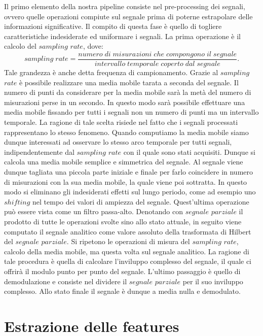 \documentclass[a4paper, 12pt]{book}
\begin{document}
Il primo elemento della nostra pipeline consiste nel pre-processing dei segnali, ovvero quelle operazioni compiute sul segnale prima di poterne estrapolare delle informazioni significative.
Il compito di questa fase è quello di togliere caratteristiche indesiderate ed uniformare i segnali.
La prima operazione è il calcolo del $sampling$ $rate$, dove:
\begin{equation}
	sampling\; rate = \frac{numero\; di\; misurazioni\; che\; compongono\; il\; 				segnale}{intervallo\; temporale\; coperto\; dal\; segnale}.
\end{equation}
Tale grandezza è anche detta frequenza di campionamento.
Grazie al $sampling$ $rate$ è possibile realizzare una media mobile tarata a seconda del segnale.
Il numero di punti da considerare per la media mobile sarà la metà del numero di misurazioni perse in un secondo.
In questo modo sarà possibile effettuare una media mobile fissando per tutti i segnali non un numero di punti ma un intervallo temporale.
La ragione di tale scelta risiede nel fatto che i segnali processati rappresentano lo stesso fenomeno.
Quando computiamo la media mobile siamo dunque interessati ad osservare lo stesso arco temporale per tutti segnali, indipendentemente dal $sampling$ $rate$ con il quale sono stati acquisiti.
Dunque si calcola una media mobile semplice e simmetrica del segnale.
Al segnale viene dunque tagliata una piccola parte iniziale e finale per farlo coincidere in numero di misurazioni con la sua media mobile, la quale viene poi sottratta.
In questo modo si eliminano gli indesiderati effetti sul lungo periodo, come ad esempio uno $shifting$ nel tempo dei valori di ampiezza del segnale.
Quest'ultima operazione può essere vista come un filtro passa-alto.
Denotando con $segnale$ $parziale$ il prodotto di tutte le operazioni svolte sino allo stato attuale, in seguito viene computato il segnale analitico come valore assoluto della trasformata di Hilbert del $segnale$ $parziale$.
Si ripetono le operazioni di misura del $sampling$ $rate$, calcolo della media mobile, ma questa volta sul segnale analitico.
La ragione di tale procedura è quella di calcolare l'inviluppo complesso del segnale, il quale ci offrirà il modulo punto per punto del segnale.
L'ultimo passaggio è quello di demodulazione e consiste nel dividere il $segnale$ $parziale$ per il suo inviluppo complesso.
Allo stato finale il segnale è dunque a media nulla e demodulato.




\section{Estrazione delle features}
\end{document}
